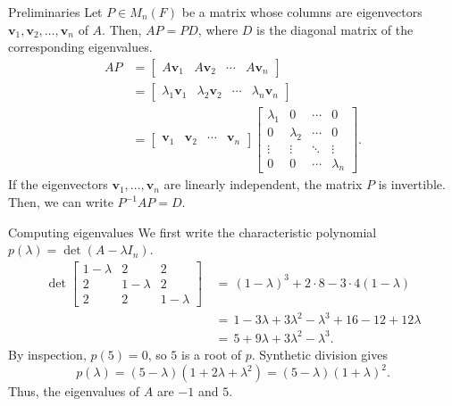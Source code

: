 \documentclass[handout]{beamer}
\def\v{\bm{v}}
\def\det{\operatorname{det}}
\begin{document}
        \begin{frame}{Preliminaries}
                Let $P \in M_n(F)$ be a matrix whose columns are eigenvectors $\v_1, \v_2, \dots, \v_n$ of $A$.
                Then, $AP = PD$, where $D$ is the diagonal matrix of the corresponding eigenvalues.
                \begin{align*}
                        AP &= \begin{bmatrix} A\v_1 & A\v_2 & \cdots & A\v_n \end{bmatrix}\\
                        &= \begin{bmatrix} \lambda_1\v_1 & \lambda_2\v_2 & \cdots & \lambda_n\v_n \end{bmatrix} \\
                        &= \begin{bmatrix}
                                \v_1 & \v_2 & \cdots & \v_n
                        \end{bmatrix}
                        \begin{bmatrix}
                                \lambda_1 & 0 & \cdots & 0 \\
                                0 & \lambda_2 & \cdots & 0 \\
                                \vdots & \vdots & \ddots & \vdots \\
                                0 & 0 & \cdots & \lambda_n
                        \end{bmatrix}.
                \end{align*}
                \pause
                If the eigenvectors $\v_1, \dots, \v_n$ are linearly independent, the matrix $P$ is invertible.
                Then, we can write  $P^{-1}AP = D$.
        \end{frame}

        \begin{frame}{Computing eigenvalues}
                We first write the characteristic polynomial $p(\lambda) = \det(A - \lambda I_n)$.
                \begin{align*}
                        \det \begin{bmatrix}
                                1 - \lambda & 2 & 2 \\ 2 & 1 - \lambda & 2 \\ 2 & 2 & 1 - \lambda
                        \end{bmatrix}
                                \,&=\, (1 - \lambda)^3  + 2\cdot 8 - 3\cdot 4(1 - \lambda) \\
                                \,&=\, 1 - 3\lambda + 3\lambda^2 - \lambda^3 + 16 - 12 + 12\lambda \\
                                \,&=\, 5 + 9\lambda + 3\lambda^2 - \lambda^3.
                \end{align*}
                \pause
                By inspection, $p(5) = 0$, so $5$ is a root of $p$. Synthetic division gives
                \[
                        p(\lambda) = (5 - \lambda)(1 + 2\lambda + \lambda^2) = (5 - \lambda)(1 + \lambda)^2.
                \]
                Thus, the eigenvalues of $A$ are $-1$ and $5$.
        \end{frame}
\end{document}
